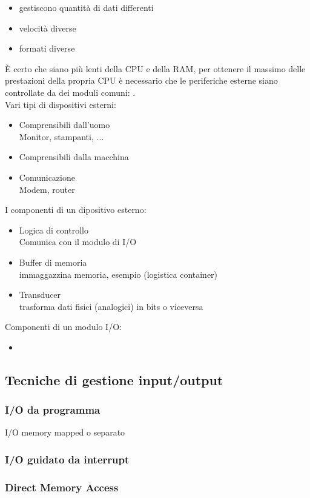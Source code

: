 \documentclass[12pt, a4paper]{article}
\begin{document}
\begin{itemize}
	\item gestiscono quantità di dati differenti
	\item velocità diverse
	\item formati diverse
\end{itemize}
È certo che siano più lenti della CPU e della RAM, per ottenere il massimo delle
prestazioni della propria CPU è necessario che le periferiche esterne siano 
controllate da dei moduli comuni: .\\

Vari tipi di dispositivi esterni:
\begin{itemize}
	\item Comprensibili dall'uomo\\
		Monitor, stampanti, ...
	\item Comprensibili dalla macchina
	\item Comunicazione\\
		Modem, router
\end{itemize}

I componenti di un dipositivo esterno:

\begin{itemize}
	\item Logica di controllo\\
		Comunica con il modulo di I/O
	\item Buffer di memoria\\
		immaggazzina memoria, esempio (logistica container)
	\item Transducer\\
		trasforma dati fisici (analogici) in bits o viceversa
\end{itemize}

Componenti di un modulo I/O:

\begin{itemize}
	\item 					
\end{itemize}

\subsection{Tecniche di gestione input/output}%
\label{sub:tecniche_di_gestione_input_output}

\subsubsection{I/O da programma}

I/O memory mapped o separato

\subsubsection{I/O guidato da interrupt}

\subsubsection{Direct Memory Access}
\end{document}
